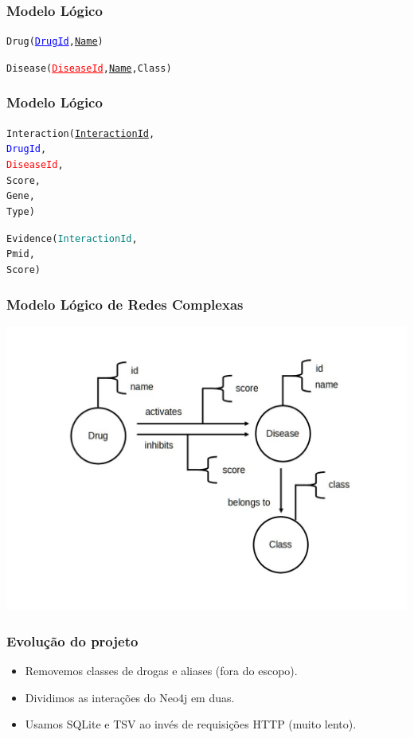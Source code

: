 \documentclass[12pt]{beamer}
\begin{document}
\begin{frame}[fragile]
  \frametitle{Modelo Lógico}

  \begin{alltt}
    Drug(\textcolor{blue}{\underline{DrugId}}, \underline{Name})
    
    Disease(\textcolor{red}{\underline{DiseaseId}}, \underline{Name}, Class)
    
  \end{alltt}
\end{frame}

\begin{frame}[fragile]
  \frametitle{Modelo Lógico}

  \begin{alltt}
    Interaction(\underline{InteractionId},
                \textcolor{blue}{DrugId},
                \textcolor{red}{DiseaseId},
                Score,
                Gene,
                Type)
               
    Evidence(\textcolor{teal}{InteractionId},
                Pmid,
                Score)
                  
  \end{alltt}
\end{frame}

\begin{frame}[fragile]
  \frametitle{Modelo Lógico de Redes Complexas}
  \centering
  \includegraphics[scale=0.275]{grafo.png}
\end{frame}

\begin{frame}[fragile]
  \frametitle{Evolução do projeto}
  
  \begin{itemize}
    \item Removemos classes de drogas e aliases (fora do escopo).
    \item Dividimos as interações do Neo4j em duas.
    \item Usamos SQLite e TSV ao invés de requisições HTTP (muito lento).
  \end{itemize}
\end{frame}
\end{document}
